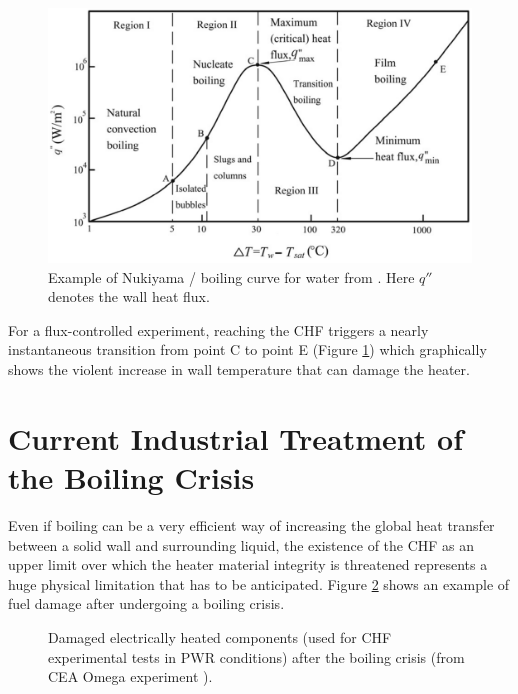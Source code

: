 \begin{figure}[!h]
\centering
\includegraphics[width=0.7\linewidth]{img/intro/nukiyama.png}
\caption{Example of Nukiyama / boiling curve for water from \cite{faghri_10_2006}. Here $q''$ denotes the wall heat flux.}
\label{fig:nukiyama_curve}
\end{figure}


\npar

For a flux-controlled experiment, reaching the CHF triggers a nearly instantaneous transition from point C to point E (Figure \ref{fig:nukiyama_curve}) which graphically shows the violent increase in wall temperature that can damage the heater.


\section{Current Industrial Treatment of the Boiling Crisis}
\label{sec:intro_chf_indus}

Even if boiling can be a very efficient way of increasing the global heat transfer between a solid wall and surrounding liquid, the existence of the CHF as an upper limit over which the heater material integrity is threatened represents a huge physical limitation that has to be anticipated. Figure \ref{fig:chf_fuel} shows an example of fuel damage after undergoing a boiling crisis.


\begin{figure}[!h]
\caption{Damaged electrically heated components (used for CHF experimental tests in PWR conditions) after the boiling crisis (from CEA Omega experiment \cite{faccanoni_etude_2008}).}
\label{fig:chf_fuel}
\end{figure}

